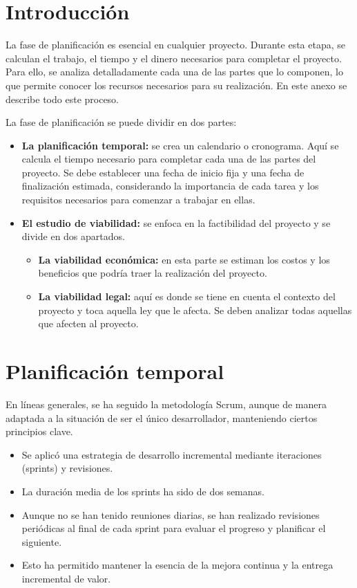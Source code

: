 
\section{Introducción}\label{plan-proyecto-introduccion}

La fase de planificación es esencial en cualquier proyecto. Durante esta etapa, se calculan el trabajo, el tiempo y el dinero necesarios para completar el proyecto. Para ello, se analiza detalladamente cada una de las partes que lo componen, lo que permite conocer los recursos necesarios para su realización. En este anexo se describe todo este proceso.

La fase de planificación se puede dividir en dos partes:

\begin{itemize}
  \item \textbf{La planificación temporal:} se crea un calendario o cronograma. Aquí se calcula el tiempo necesario para completar cada una de las partes del proyecto. Se debe establecer una fecha de inicio fija y una fecha de finalización estimada, considerando la importancia de cada tarea y los requisitos necesarios para comenzar a trabajar en ellas.
  \item \textbf{El estudio de viabilidad:} se enfoca en la factibilidad del proyecto y se divide en dos apartados. 
  \begin{itemize}
    \item \textbf{La viabilidad económica:} en esta parte se estiman los costos y los beneficios que podría traer la realización del proyecto. 
    \item \textbf{La viabilidad legal:} aquí es donde se tiene en cuenta el contexto del proyecto y toca aquella ley que le afecta. Se deben analizar todas aquellas que afecten al proyecto.
  \end{itemize}
\end{itemize}

\section{Planificación temporal}\label{planificacion-temporal}

En líneas generales, se ha seguido la metodología Scrum, aunque de manera adaptada a la situación de ser el único desarrollador, manteniendo ciertos principios clave.

\begin{itemize}
  \item Se aplicó una estrategia de desarrollo incremental mediante iteraciones (sprints) y revisiones.
  \item La duración media de los sprints ha sido de dos semanas.
  \item Aunque no se han tenido reuniones diarias, se han realizado revisiones periódicas al final de cada sprint para evaluar el progreso y planificar el siguiente.
  \item Esto ha permitido mantener la esencia de la mejora continua y la entrega incremental de valor.
\end{itemize}

